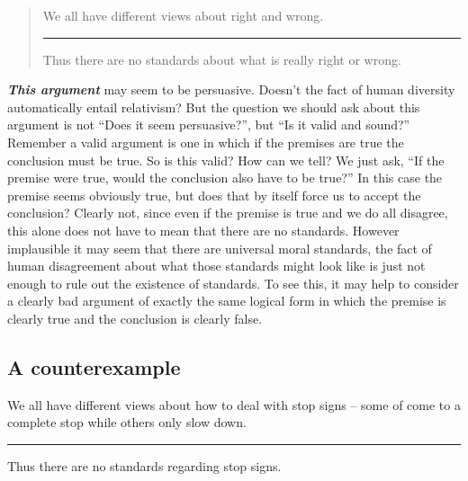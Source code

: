 \documentclass[]{book}
\makeatletter
\newenvironment{kframe}{%
\medskip{}
\setlength{\fboxsep}{.8em}
 \def\at@end@of@kframe{}%
 \ifinner\ifhmode%
  \def\at@end@of@kframe{\end{minipage}}%
  \begin{minipage}{\columnwidth}%
 \fi\fi%
 \def\FrameCommand##1{\hskip\@totalleftmargin \hskip-\fboxsep
 \colorbox{shadecolor}{##1}\hskip-\fboxsep
     \hskip-\linewidth \hskip-\@totalleftmargin \hskip\columnwidth}%
 \MakeFramed {\advance\hsize-\width
   \@totalleftmargin\z@ \linewidth\hsize
   \@setminipage}}%
 {\par\unskip\endMakeFramed%
 \at@end@of@kframe}
\newenvironment{rmdblock}[1]
  {
  \begin{itemize}
  \renewcommand{\labelitemi}{
    \raisebox{-.7\height}[0pt][0pt]{
      {\setkeys{Gin}{width=3em,keepaspectratio}\texttt{[image: img/\#1]}}
    }
  }
  \setlength{\fboxsep}{1em}
  \begin{kframe}
  \item
  }
  {
  \end{kframe}
  \end{itemize}
  }
\newenvironment{rmdwarning}
  {\begin{rmdblock}{warning}}
  {\end{rmdblock}}
\newenvironment{argument}{\begin{quote}\normalsize}{\end{quote}}
\makeatother
\begin{document}
\begin{argument}
We all have different views about right and wrong.

\begin{center}\rule{0.5\linewidth}{\linethickness}\end{center}

Thus there are no standards about what is really right or wrong.
\end{argument}

\textbf{\emph{This argument}} may seem to be persuasive. Doesn't the fact of human diversity automatically entail relativism? But the question we should ask about this argument is not ``Does it seem persuasive?'', but ``Is it valid and sound?'' Remember a valid argument is one in which if the premises are true the conclusion must be true. So is this valid? How can we tell? We just ask, ``If the premise were true, would the conclusion also have to be true?'' In this case the premise seems obviously true, but does that by itself force us to accept the conclusion? Clearly not, since even if the premise is true and we do all disagree, this alone does not have to mean that there are no standards. However implausible it may seem that there are universal moral standards, the fact of human disagreement about what those standards might look like is just not enough to rule out the existence of standards. To see this, it may help to consider a clearly bad argument of exactly the same logical form in which the premise is clearly true and the conclusion is clearly false.

\hypertarget{a-counterexample}{%
\subsection*{A counterexample}\label{a-counterexample}}


\begin{rmdwarning}
We all have different views about how to deal with stop signs -- some of
come to a complete stop while others only slow down.

\begin{center}\rule{0.5\linewidth}{\linethickness}\end{center}

Thus there are no standards regarding stop signs.
\end{rmdwarning}
\end{document}
